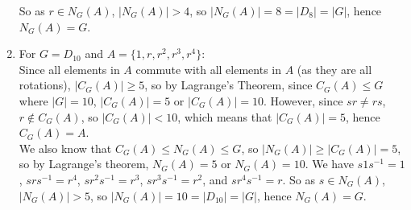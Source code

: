 \documentclass{article}
\begin{document}
\begin{enumerate}[label=\textbf{\alph*.}]
            So as $r \in N_G(A)$, $|N_G(A)| > 4$,
            so $|N_G(A)| = 8 = |D_8| = |G|$,
            hence $N_G(A) = G$.
        \item
            For $G = D_{10}$ and $A = \{ 1, r, r^2, r^3, r^4 \}$: \\
            Since all elements in $A$ commute with all elements in $A$
            (as they are all rotations),
            $|C_G(A)| \geqslant 5$,
            so by Lagrange's Theorem,
            since $C_G(A) \leqslant G$ where $|G| = 10$,
            $|C_G(A)| = 5$ or $|C_G(A)| = 10$.
            However, since $sr \neq rs$, $r \notin C_G(A)$,
            so $|C_G(A)| < 10$,
            which means that $|C_G(A)| = 5$,
            hence $C_G(A) = A$. \\
            We also know that $C_G(A) \leqslant N_G(A) \leqslant G$,
            so $|N_G(A)| \geqslant |C_G(A)| = 5$,
            so by Lagrange's theorem, $N_G(A) = 5$ or $N_G(A) = 10$.
            We have $s1s^{-1} = 1$, $srs^{-1} = r^4$,
            $sr^2s^{-1} = r^3$, $sr^3s^{-1} = r^2$, and $sr^4s^{-1} = r$.
            So as $s \in N_G(A)$, $|N_G(A)| > 5$,
            so $|N_G(A)| = 10 = |D_{10}| = |G|$,
            hence $N_G(A) = G$.
    \end{enumerate}
\end{document}
